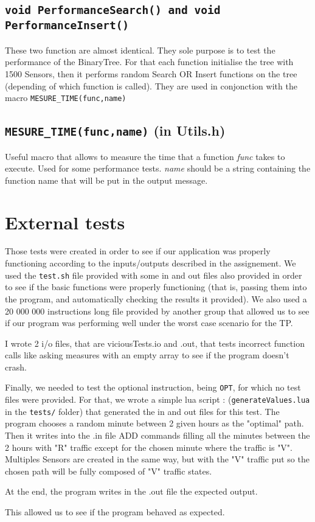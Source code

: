 \documentclass[10pt]{article}
\begin{document}
\subsection{\tt void PerformanceSearch() and void PerformanceInsert()}
These two function are almost identical. They sole purpose is to test the performance of the BinaryTree. For that each function initialise the tree with 1500 Sensors, then it performs random Search OR Insert functions on the tree (depending of which function is called). They are used in conjonction with the macro \texttt{MESURE\_TIME(func,name)}

\subsection{\texttt{MESURE\_TIME(func,name)} (in Utils.h)}
Useful macro that allows to measure the time that a function \emph{func} takes to execute. Used for some performance tests. \emph{name} should be a string containing the function name that will be put in the output message.

\section{External tests}
Those tests were created in order to see if our application was properly functioning according to the inputs/outputs described in the assignement. We used the \texttt{test.sh} file provided with some in and out files also provided in order to see if the basic functions were properly functioning (that is, passing them into the program, and automatically checking the results it provided). We also used a 20 000 000 instructions long file provided by another group that allowed us to see if our program was performing well under the worst case scenario for the TP.

I wrote 2 i/o files, that are viciousTests.io and .out, that tests incorrect function calls like asking measures with an empty array to see if the program doesn't crash.

Finally, we needed to test the optional instruction, being \texttt{OPT}, for which no test files were provided. For that, we wrote a simple lua script : (\texttt{generateValues.lua} in the \texttt{tests/} folder) that generated the in and out files for this test. The program chooses a random minute between 2 given hours as the "optimal" path. Then it writes into the .in file ADD commands filling all the minutes between the 2 hours with "R" traffic except for the chosen minute where the traffic is "V". Multiples Sensors are created in the same way, but with the "V" traffic put so the chosen path will be fully composed of "V" traffic states.

At the end, the program writes in the .out file the expected output.

This allowed us to see if the program behaved as expected.
\end{document}

